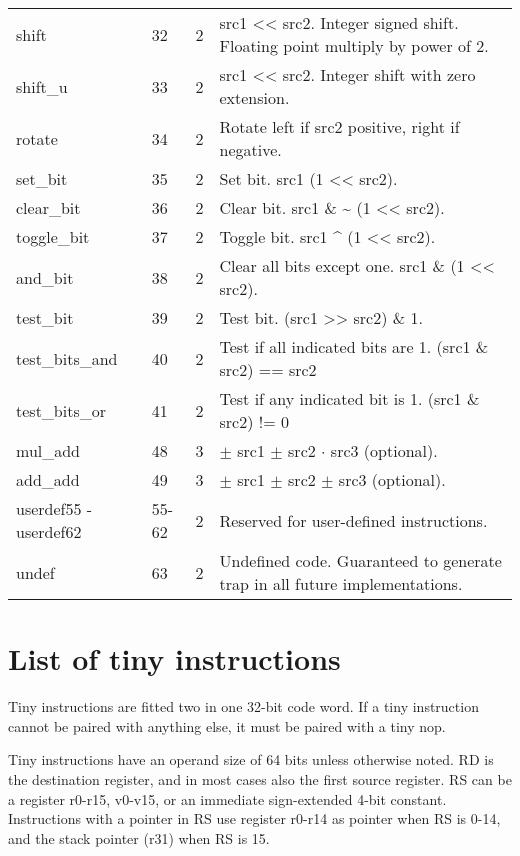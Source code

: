 \documentclass[forwardcom.tex]{subfiles}
\begin{document}
\begin{longtable} {|p{18mm}|p{9mm}|p{9mm}|p{76mm}|}
shift        & 32 & 2 & src1 \textless\textless{} src2. Integer signed shift. Floating point multiply by power of 2. \\
shift\_u     & 33 & 2 & src1 \textless\textless{} src2. Integer shift with zero extension. \\

rotate       & 34 & 2 & Rotate left if src2 positive, right if negative. \\
set\_bit     & 35 & 2 & Set bit. src1 \textbar{} (1 \textless\textless{} src2). \\
clear\_bit   & 36 & 2 & Clear bit. src1 \& \~{} (1 \textless\textless{} src2). \\
toggle\_bit  & 37 & 2 & Toggle bit. src1 \^{} (1 \textless\textless{} src2). \\
and\_bit     & 38 & 2 & Clear all bits except one. src1 \&{} (1 \textless\textless{} src2). \\
test\_bit    & 39 & 2 & Test bit. (src1 \textgreater\textgreater{} src2) \& 1. \\
test\_bits\_and & 40 & 2 & Test if all indicated bits are 1. (src1 \& src2) == src2 \\
test\_bits\_or  & 41 & 2 & Test if any indicated bit is 1. (src1 \& src2) != 0 \\

mul\_add     & 48 & 3 & $\pm$ src1 $\pm$ src2 $\cdot$ src3 (optional). \\
add\_add     & 49 & 3 & $\pm$ src1 $\pm$ src2 $\pm$ src3 (optional). \\
userdef55 - userdef62
             & 55-62 & 2 & Reserved for user-defined instructions. \\
undef        & 63 & 2 & Undefined code. Guaranteed to generate trap in all future implementations. \\
\hline
\end{longtable}


\section{List of tiny instructions}
Tiny instructions are fitted two in one 32-bit code word. If a tiny instruction cannot be paired with anything else, it must be paired with a tiny nop.
\vspace{2mm}

Tiny instructions have an operand size of 64 bits unless otherwise noted. RD is the destination register, and in most cases also the first source register. RS can be a register r0-r15, v0-v15, or an immediate sign-extended 4-bit constant. Instructions with a pointer in RS use register r0-r14 as pointer when RS is 0-14, and the stack pointer (r31) when RS is 15.
\vspace{2mm}
\end{document}
